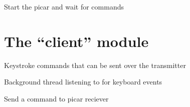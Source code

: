 \documentclass[letterpaper,10pt,english]{sphinxmanual}
\begin{document}

\begin{fulllineitems}
\label{\detokenize{index:server.main}}
Start the picar and wait for commands

\end{fulllineitems}



\chapter{The “client” module}
\label{\detokenize{index:module-client}}\label{\detokenize{index:the-client-module}}

\begin{fulllineitems}
\label{\detokenize{index:client.Keyboard}}
Keystroke commands that can be sent over the transmitter

\begin{fulllineitems}
\label{\detokenize{index:client.Keyboard.run}}
Background thread listening to for keyboard events

\end{fulllineitems}


\begin{fulllineitems}
\label{\detokenize{index:client.Keyboard.run_cmd}}
Send a command to picar reciever

\end{fulllineitems}


\end{fulllineitems}

\end{document}
